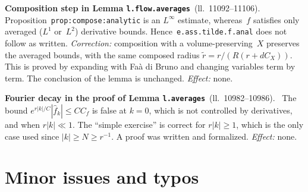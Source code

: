 \documentclass[11pt]{amsart}
\newcommand{\Lns}[1]{ll.~#1}
\newcommand{\lab}[1]{\texttt{#1}}
\theoremstyle{remark}
\newenvironment{erratum}[2]{\par\smallskip\noindent\textbf{#1}\ {\small(#2)}.\ }{\par}
\begin{document}
\begin{erratum}{Composition step in Lemma \lab{l.flow.averages}}{\Lns{11092--11106}}
Proposition~\lab{prop:compose:analytic} is an $L^\infty$ estimate, whereas~$f$ satisfies only averaged ($L^1$ or~$L^2$) derivative bounds. Hence~\lab{e.ass.tilde.f.anal} does not follow as written. \emph{Correction:} composition with a volume-preserving~$X$ preserves the averaged bounds, with the same composed radius $\tilde r=r/(R(r+dC_X))$. This is proved by expanding with Faà di Bruno and changing variables term by term. The conclusion of the lemma is unchanged. \emph{Effect:} none.
\end{erratum}

\begin{erratum}{Fourier decay in the proof of Lemma \lab{l.averages}}{\Lns{10982--10986}}
The bound $e^{r|k|/C}|\hat f_k|\leq CC_f$ is false at $k=0$, which is not controlled by derivatives, and when $r|k|\ll1$. The ``simple exercise'' is correct for $r|k|\geq1$, which is the only case used since $|k|\geq N\geq r^{-1}$. A proof was written and formalized. \emph{Effect:} none.
\end{erratum}

\section{Minor issues and typos}
\label{s.minor}
\end{document}
